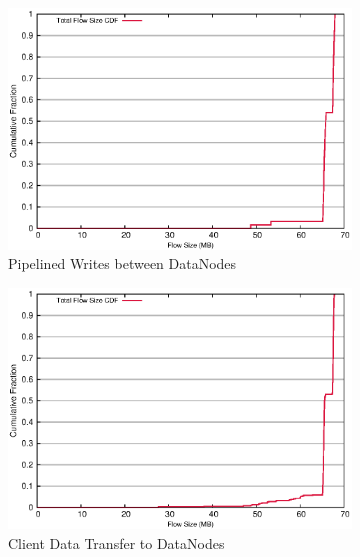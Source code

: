 \begin{figure}[!ht]
\begin{subfigure}[b]{.45\linewidth}
	\includegraphics[width=.99\textwidth]{figures/6writes/36_44_type_flow_size.eps} 
	\caption{Pipelined Writes between DataNodes}\label{fig:write_size:pipe_write}
   \end{subfigure} %
  \begin{subfigure}[b]{.45\linewidth}
   \centering
	\includegraphics[width=.99\textwidth]{figures/6writes/32_36_type_flow_size.eps} 
	\caption{Client Data Transfer to DataNodes}\label{fig:write_size:client_write}
   \end{subfigure} \\%
  \begin{subfigure}[b]{.75\linewidth}
   \centering

\end{subfigure}
\end{figure}
